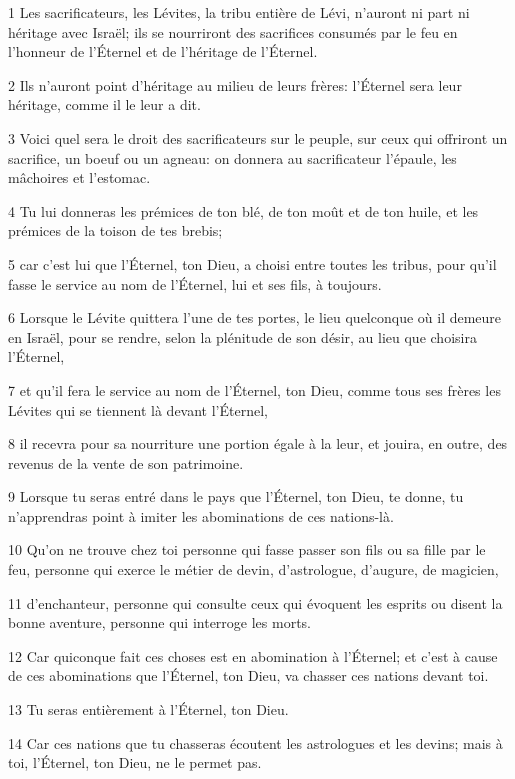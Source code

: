 \par 1 Les sacrificateurs, les Lévites, la tribu entière de Lévi, n'auront ni part ni héritage avec Israël; ils se nourriront des sacrifices consumés par le feu en l'honneur de l'Éternel et de l'héritage de l'Éternel.
\par 2 Ils n'auront point d'héritage au milieu de leurs frères: l'Éternel sera leur héritage, comme il le leur a dit.
\par 3 Voici quel sera le droit des sacrificateurs sur le peuple, sur ceux qui offriront un sacrifice, un boeuf ou un agneau: on donnera au sacrificateur l'épaule, les mâchoires et l'estomac.
\par 4 Tu lui donneras les prémices de ton blé, de ton moût et de ton huile, et les prémices de la toison de tes brebis;
\par 5 car c'est lui que l'Éternel, ton Dieu, a choisi entre toutes les tribus, pour qu'il fasse le service au nom de l'Éternel, lui et ses fils, à toujours.
\par 6 Lorsque le Lévite quittera l'une de tes portes, le lieu quelconque où il demeure en Israël, pour se rendre, selon la plénitude de son désir, au lieu que choisira l'Éternel,
\par 7 et qu'il fera le service au nom de l'Éternel, ton Dieu, comme tous ses frères les Lévites qui se tiennent là devant l'Éternel,
\par 8 il recevra pour sa nourriture une portion égale à la leur, et jouira, en outre, des revenus de la vente de son patrimoine.
\par 9 Lorsque tu seras entré dans le pays que l'Éternel, ton Dieu, te donne, tu n'apprendras point à imiter les abominations de ces nations-là.
\par 10 Qu'on ne trouve chez toi personne qui fasse passer son fils ou sa fille par le feu, personne qui exerce le métier de devin, d'astrologue, d'augure, de magicien,
\par 11 d'enchanteur, personne qui consulte ceux qui évoquent les esprits ou disent la bonne aventure, personne qui interroge les morts.
\par 12 Car quiconque fait ces choses est en abomination à l'Éternel; et c'est à cause de ces abominations que l'Éternel, ton Dieu, va chasser ces nations devant toi.
\par 13 Tu seras entièrement à l'Éternel, ton Dieu.
\par 14 Car ces nations que tu chasseras écoutent les astrologues et les devins; mais à toi, l'Éternel, ton Dieu, ne le permet pas.
